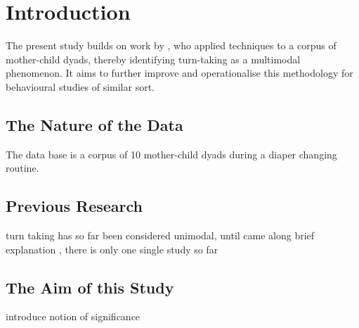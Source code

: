 
\chapter{Introduction}
The present study builds on work by , who applied \fpm{} techniques to a corpus of mother-child dyads, thereby identifying turn-taking as a multimodal phenomenon. It aims to further improve and operationalise this methodology for behavioural studies of similar sort.

\section{The Nature of the Data}
The data base is a corpus of 10 mother-child dyads during a diaper changing routine.%

\section{Previous Research}
turn taking has so far been considered unimodal, until  came along
brief explanation \fpm, there is only one single study so far

\section{The Aim of this Study}
introduce notion of significance



